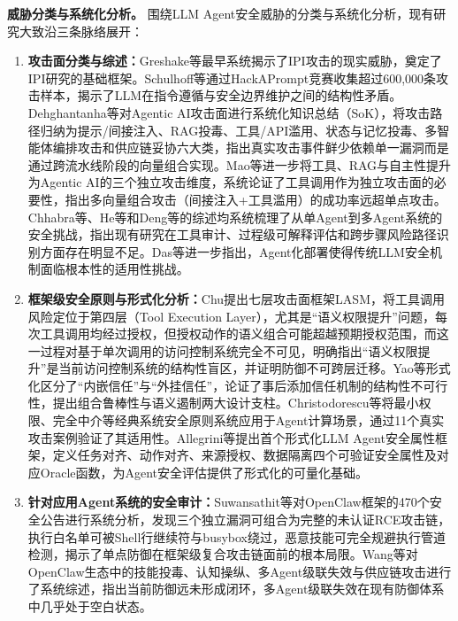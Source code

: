 \textbf{威胁分类与系统化分析。}
围绕LLM Agent安全威胁的分类与系统化分析，现有研究大致沿三条脉络展开：
\begin{enumerate}
  \item \textbf{攻击面分类与综述：}Greshake等\cite{greshake2023notwhat}最早系统揭示了IPI攻击的现实威胁，奠定了IPI研究的基础框架。Schulhoff等\cite{schulhoff2023ignore}通过HackAPrompt竞赛收集超过600,000条攻击样本，揭示了LLM在指令遵循与安全边界维护之间的结构性矛盾。Dehghantanha等\cite{dehghantanha2026sokattacksurfaceagentic}对Agentic AI攻击面进行系统化知识总结（SoK），将攻击路径归纳为提示/间接注入、RAG投毒、工具/API滥用、状态与记忆投毒、多智能体编排攻击和供应链妥协六大类，指出真实攻击事件鲜少依赖单一漏洞而是通过跨流水线阶段的向量组合实现。Mao等\cite{mao2026sok}进一步将工具、RAG与自主性提升为Agentic AI的三个独立攻击维度，系统论证了工具调用作为独立攻击面的必要性，指出多向量组合攻击（间接注入+工具滥用）的成功率远超单点攻击。Chhabra等\cite{chhabra2025agentic}、He等\cite{he2025survey}和Deng等\cite{deng2025agentsunderthreat}的综述均系统梳理了从单Agent到多Agent系统的安全挑战，指出现有研究在工具审计、过程级可解释评估和跨步骤风险路径识别方面存在明显不足。Das等\cite{das2025security}进一步指出，Agent化部署使得传统LLM安全机制面临根本性的适用性挑战。
  \item \textbf{框架级安全原则与形式化分析：}Chu\cite{chu2026systematic}提出七层攻击面框架LASM，将工具调用风险定位于第四层（Tool Execution Layer），尤其是“语义权限提升”问题，每次工具调用均经过授权，但授权动作的语义组合可能超越预期授权范围，而这一过程对基于单次调用的访问控制系统完全不可见，明确指出“语义权限提升”是当前访问控制系统的结构性盲区，并证明防御不可跨层迁移。Yao等\cite{yao2026trustworthy}形式化区分了“内嵌信任”与“外挂信任”，论证了事后添加信任机制的结构性不可行性，提出组合鲁棒性与语义遏制两大设计支柱。Christodorescu等\cite{christodorescu2025systems}将最小权限、完全中介等经典系统安全原则系统应用于Agent计算场景，通过11个真实攻击案例验证了其适用性。Allegrini等\cite{allegrini2025formalizing}提出首个形式化LLM Agent安全属性框架，定义任务对齐、动作对齐、来源授权、数据隔离四个可验证安全属性及对应Oracle函数，为Agent安全评估提供了形式化的可量化基础。
  \item \textbf{针对应用Agent系统的安全审计：}Suwansathit等\cite{suwansathit2026security}对OpenClaw框架的470个安全公告进行系统分析，发现三个独立漏洞可组合为完整的未认证RCE攻击链，执行白名单可被Shell行继续符与busybox绕过，恶意技能可完全规避执行管道检测，揭示了单点防御在框架级复合攻击链面前的根本局限。Wang等\cite{wang2026security}对OpenClaw生态中的技能投毒、认知操纵、多Agent级联失效与供应链攻击进行了系统综述，指出当前防御远未形成闭环，多Agent级联失效在现有防御体系中几乎处于空白状态。
\end{enumerate}

